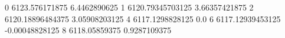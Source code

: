 0 6123.576171875 6.4462890625
1 6120.79345703125 3.66357421875
2 6120.18896484375 3.05908203125
4 6117.1298828125 0.0
6 6117.12939453125 -0.00048828125
8 6118.05859375 0.9287109375
